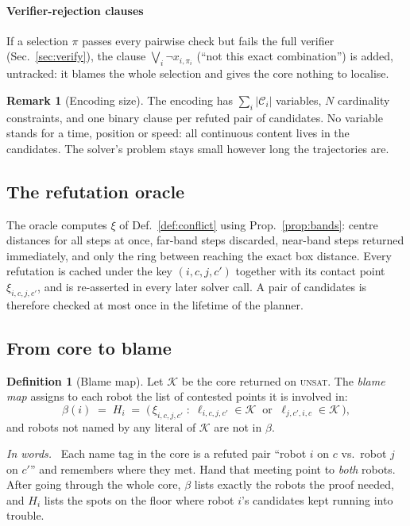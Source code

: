 \documentclass[conference]{IEEEtran}
\theoremstyle{plain}
\theoremstyle{definition}
\newtheorem{definition}{Definition}
\newtheorem{remark}{Remark}
\newcommand{\inwords}{\par\smallskip\noindent\textit{In words.}\ }
\newcommand{\Cand}{\mathcal{C}}
\newcommand{\Core}{\mathcal{K}}
\begin{document}
\paragraph*{Verifier-rejection clauses}
If a selection $\pi$ passes every pairwise check but fails the full verifier
(Sec.~\ref{sec:verify}), the clause $\bigvee_i \neg x_{i,\pi_i}$ (``not this exact
combination'') is added, untracked: it blames the whole selection and gives the core nothing
to localise.

\begin{remark}[Encoding size]
The encoding has $\sum_i |\Cand_i|$ variables, $N$ cardinality constraints, and one binary
clause per refuted pair of candidates. No variable stands for a time, position or speed: all
continuous content lives in the candidates. The solver's problem stays small however long the
trajectories are.
\end{remark}

\subsection{The refutation oracle}
\label{sec:oracle}

The oracle computes $\xi$ of Def.~\ref{def:conflict} using Prop.~\ref{prop:bands}: centre
distances for all steps at once, far-band steps discarded, near-band steps returned
immediately, and only the ring between reaching the exact box distance. Every refutation is
cached under the key $(i,c,j,c')$ together with its contact point $\xi_{i,c,j,c'}$, and is
re-asserted in every later solver call. A pair of candidates is therefore checked at most
once in the lifetime of the planner.

\subsection{From core to blame}
\label{sec:core}

\begin{definition}[Blame map]
\label{def:blame}
Let $\Core$ be the core returned on \textsc{unsat}. The \emph{blame map} assigns to each robot
the list of contested points it is involved in:
\begin{equation}
  \beta(i) \;=\; H_i \;=\; \big(\, \xi_{i,c,j,c'} \;:\; \ell_{i,c,j,c'} \in \Core \ \text{ or }\
  \ell_{j,c',i,c} \in \Core \,\big),
  \label{eq:blame}
\end{equation}
and robots not named by any literal of $\Core$ are not in $\beta$.
\inwords
Each name tag in the core is a refuted pair ``robot $i$ on $c$ vs.\ robot $j$ on $c'$'' and
remembers where they met. Hand that meeting point to \emph{both} robots. After going through
the whole core, $\beta$ lists exactly the robots the proof needed, and $H_i$ lists the spots
on the floor where robot $i$'s candidates kept running into trouble.
\end{definition}
\end{document}
